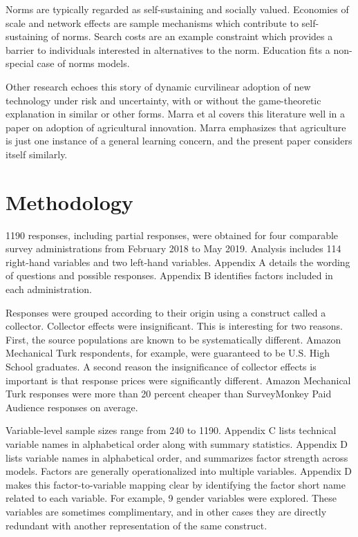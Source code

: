 \documentclass[AER]{./aea-latex-templates/AEA}
\begin{document}
        Norms are typically regarded as self-sustaining and socially
        valued\cite{dequech2006institutions}. Economies of scale and
        network effects are sample mechanisms which contribute to
        self-sustaining of norms. Search costs are an example constraint
        which provides a barrier to individuals interested in alternatives
        to the norm. Education fits a non-special case of norms models.
        
        Other research echoes this story of dynamic curvilinear adoption of new
        technology under risk and uncertainty, with or without the game-theoretic
        explanation in similar or other forms. Marra et al covers this literature
        well in a paper on adoption of agricultural innovation\cite{marra2003economics}. Marra emphasizes
        that agriculture is just one instance of a general learning concern, and
        the present paper considers itself similarly.
        
        \section{Methodology}
        
        1190 responses, including partial responses, were obtained for four
        comparable survey administrations from February 2018 to May 2019.
        Analysis includes 114 right-hand variables and two left-hand variables.
        Appendix A details the wording of questions and possible responses.
        Appendix B identifies factors included in each administration.
        
        Responses were grouped according to their origin using
        a construct called a collector. Collector effects
        were insignificant. This is interesting for two reasons. First, the source
        populations are known to be systematically different. Amazon Mechanical Turk
        respondents, for example, were guaranteed to be U.S. High School graduates. A second
        reason the insignificance of collector effects is important is that
        response prices were significantly different. Amazon Mechanical Turk
        responses were more than 20 percent cheaper than SurveyMonkey Paid Audience
        responses on average.
        
        Variable-level sample sizes range from 240 to 1190. Appendix C lists
        technical variable names in alphabetical order along with summary
        statistics. Appendix D lists variable names in alphabetical order, and
        summarizes factor strength across models. Factors are generally
        operationalized into multiple variables. Appendix D makes this
        factor-to-variable mapping clear by identifying the factor short name
        related to each variable. For example, 9 gender variables were explored.
        These variables are sometimes complimentary, and in other cases they are
        directly redundant with another representation of the same construct.
        
\end{document}
